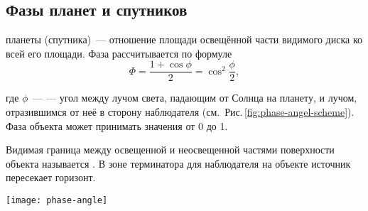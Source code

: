 \subsection{Фазы планет и спутников}

 планеты (спутника)~--- отношение площади освещённой  части видимого диска ко всей его площади.
Фаза рассчитывается по формуле
\begin{equation}
\Phi = \frac{1 + \cos \phi}{2} = \cos^2 \frac{\phi}{2},
\end{equation}
\begin{minipage}{0.67\tw}
где $\phi$~---  --- угол между лучом света, падающим от Солнца на планету, и лучом, отразившимся от неё в сторону наблюдателя (см.~Рис.\,\ref{fig:phase-angel-scheme}). Фаза объекта может принимать значения от 0 до 1.

Видимая граница между освещенной и неосвещенной частями поверхности объекта называется . В зоне терминатора для наблюдателя на объекте источник пересекает горизонт.
\end{minipage}
\hfill
\begin{minipage}{0.31\tw}
	\hfill
	\vspace{-.5pc}
	\texttt{[image: phase-angle]}
	\label{fig:phase-angel-scheme}
\end{minipage}

